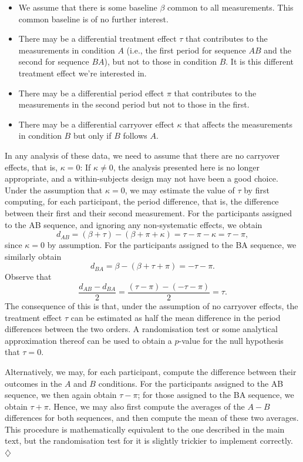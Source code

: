 \documentclass[a4paper]{tufte-book}\usepackage[]{graphicx}\usepackage[]{xcolor}
\newcommand*{\parend}[1][$\diamondsuit$]{%
  \unskip\nobreak\hspace{1em plus 1fill}$\diamondsuit$%
}
\begin{document}
\medskip

\begin{itemize}
  \item We assume that there is some baseline $\beta$ common to all measurements.
        This common baseline is of no further interest.
  
  \item There may be a differential treatment effect $\tau$
        that contributes to the measurements in condition $A$ 
        (i.e., the first period for sequence $AB$ and the second
        for sequence $BA$), but not to those in condition $B$.
        It is this different treatment effect we're interested in.
      
  \item There may be a differential period effect $\pi$ that contributes to 
        the measurements in the second period but not to those in the first.
        
  \item There may be a differential carryover effect $\kappa$ 
        that affects the measurements in condition $B$ 
        but only if $B$ follows $A$.
\end{itemize}

In any analysis of these data, 
we need to assume that there are no carryover effects, that is, $\kappa = 0$:
If $\kappa \neq 0$, 
the analysis presented here is no longer appropriate,
and a within-subjects design may not have been a good choice.
Under the assumption that $\kappa = 0$, 
we may estimate the value of $\tau$ by first computing,
for each participant, the period difference, that is, 
the difference between their first and their second measurement.
For the participants assigned to the AB sequence, and ignoring any non-systematic effects, 
we obtain
\[
  d_{AB} = (\beta + \tau) - (\beta + \pi + \kappa) = \tau - \pi - \kappa = \tau - \pi,
\]
since $\kappa = 0$ by assumption.
For the participants assigned to the BA sequence, we similarly obtain
\[
  d_{BA} = \beta - (\beta + \tau + \pi) = - \tau - \pi.
\]
Observe that
\[
  \frac{d_{AB} - d_{BA}}{2} = \frac{(\tau - \pi) - (- \tau - \pi)}{2} = \tau.
\]
The consequence of this is that, under the assumption of no carryover effects,
the treatment effect $\tau$ can be estimated as half the mean difference in the period
differences between the two orders.
A randomisation test or some analytical approximation thereof 
can be used to obtain a $p$-value for the null hypothesis
that $\tau = 0$.

\label{rem:averageofaverages}
  Alternatively, we may, for each participant, compute the difference
  between their outcomes in the $A$ and $B$ conditions.
  For the participants assigned to the AB sequence,
  we then again obtain $\tau - \pi$;
  for those assigned to the BA sequence,
  we obtain $\tau + \pi$.
  Hence, we may also first compute the averages of the $A - B$ differences
  for both sequences, and then compute the mean of these two averages.
  This procedure is mathematically equivalent to the one described in the main text,
  but the randomisation test for it is slightly trickier to implement correctly.
\parend
\end{document}

